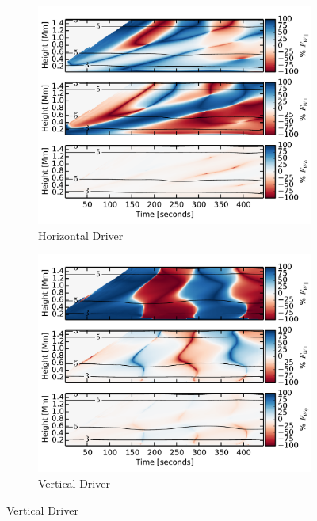 \begin{figure}
    \centering
    \begin{subfigure}[b]{0.49\textwidth}
        \includegraphics[width=\columnwidth]{Chapter4/Figs/WaveFlux_TD_Percent_horiz_p240_A10_r30.pdf}
        \caption{Horizontal Driver}
    \end{subfigure}
    \begin{subfigure}[b]{0.49\textwidth}
        \includegraphics[width=\columnwidth]{Chapter4/Figs/WaveFlux_TD_Percent_vert_p240_A10_r30.pdf}
        \caption{Vertical Driver}
    \end{subfigure}
    

\end{figure}
